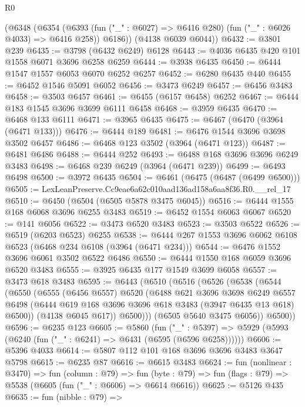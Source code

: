 \begin{lexlean}{R0}
\begin{coremodule}
      (@6348
        (@6354
          (@6393 (fun ("_" : @6027) => @6416 @280) (fun ("_" : @6026 @4033) => @6416 @258))
          @6186))
      (@4138 @6039 @6044))
@6432 := @3801 @239
@6435 := @3798 (@6432 @6249) @6128
@6443 := @4036 @6435 @420 @101 @1558 @6071 @3696 @6258 @6259
@6444 := @3938 @6435
@6450 := @6444 @1547 @1557 @6053 @6070 @6252 @6257
@6452 := @6280 @6435 @440
@6455 := @6452 @1546 @5091 @6052
@6456 := @3473 @6249
@6457 := @6456 @3483
@6458 := @3503 @6457
@6461 := @6455 (@6157 @6458) @6252
@6467 := @6444 @183 @1545 @3696 @3699 @6111 @6458
@6468 := @3959 @6435
@6470 := @6468 @133 @6111
@6471 := @3965 @6435
@6475 := @6467 (@6470 (@3964 (@6471 @133)))
@6476 := @6444 @189
@6481 := @6476 @1544 @3696 @3698 @3502 @6457
@6486 := @6468 @123 @3502 (@3964 (@6471 @123))
@6487 := @6481 @6486
@6488 := @6444 @252
@6493 := @6488 @168 @3696 @3696 @6249 @3483
@6498 := @6468 @239 @6249 (@3964 (@6471 @239))
@6499 := @6493 @6498
@6500 := @3972 @6435
@6504 := @6461 (@6475 (@6487 (@6499 @6500)))
@6505 := LexLeanPreserve.Cc9eae6a62c010aad136ad158a6aa8f36.R0.__rel_17
@6510 := @6450 (@6504 (@6505 @5878 @3475 @6045))
@6516 := @6444 @1555 @168 @6068 @3696 @6255 @3483
@6519 := @6452 @1554 @6063 @6067
@6520 := @141 @6056
@6522 := @3473 @6520 @3483
@6523 := @3503 @6522
@6526 := @6519 (@6203 @6523) @6255
@6538 := @6444 @267 @1553 @3696 @6062 @6108 @6523 (@6468 @234 @6108 (@3964 (@6471 @234)))
@6544 := @6476 @1552 @3696 @6061 @3502 @6522 @6486
@6550 := @6444 @1550 @168 @6059 @3696 @6520 @3483
@6555 := @3925 @6435 @177 @1549 @3699 @6058
@6557 := @3473 @618 @3483
@6595 := @6443
    (@6510
      (@6516
        (@6526
          (@6538
            (@6544
              (@6550
                (@6555
                  (@6456 @6557)
                  @6520
                  (@6488
                    @621
                    @3696
                    @3698
                    @6249
                    @6557
                    @6498
                    (@6444 @619 @168 @3696 @3696 @618 @3483 (@3947 @6435 @13 @618) @6500))
                  (@4138 @6045 @617))
                @6500)))
          (@6505 @5640 @3475 @6056))
        @6500))
@6596 := @6235 @123
@6605 := @5860
    (fun ("_" : @5397) => @5929 (@5993 (@6240 (fun ("_" : @6241) => @6431 (@6595 (@6596 @6258))))))
@6606 := @5396 @4033
@6614 := @5807 @112 @101 @168 @3696 @3696 @3483 @3647 @5798
@6615 := @6235 @87
@6616 := @6615 @3483
@6624 := fun (nonlinear : @3470) =>
  fun (column : @79) =>
  fun (byte : @79) => fun (flags : @79) => @5538 (@6605 (fun ("_" : @6606) => @6614 @6616))
@6625 := @5126 @435
@6635 := fun (nibble : @79) =>

\end{coremodule}
\end{lexlean}
